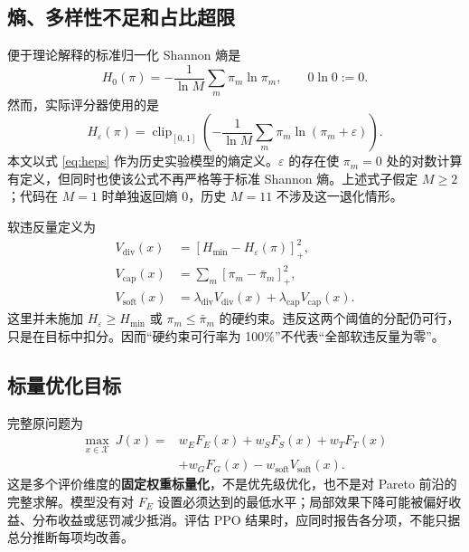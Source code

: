 \documentclass[UTF8,11pt,a4paper,fontset=fandol]{ctexart}
\newcommand{\clip}{\operatorname{clip}_{[0,1]}}
\newcommand{\X}{\mathcal X}
\begin{document}
\subsection{熵、多样性不足和占比超限}
便于理论解释的标准归一化 Shannon 熵是
\begin{equation}
 H_0(\pi)=-\frac{1}{\ln M}\sum_m\pi_m\ln\pi_m,\qquad 0\ln0:=0.\label{eq:h0}
\end{equation}
然而，实际评分器使用的是
\begin{equation}
 H_\varepsilon(\pi)=\clip\left(-\frac{1}{\ln M}
           \sum_m\pi_m\ln(\pi_m+\varepsilon)\right).\label{eq:heps}
\end{equation}
本文以式 \eqref{eq:heps} 作为历史实验模型的熵定义。$\varepsilon$ 的存在使 $\pi_m=0$ 处的对数计算有定义，但同时也使该公式不再严格等于标准 Shannon 熵。上述式子假定 $M\ge2$；代码在 $M=1$ 时单独返回熵 0，历史 $M=11$ 不涉及这一退化情形。

软违反量定义为
\begin{align}
 V_{\mathrm{div}}(x)&=[H_{\min}-H_\varepsilon(\pi)]_+^2,\label{eq:vdiv}\\
 V_{\mathrm{cap}}(x)&=\sum_m[\pi_m-\bar\pi_m]_+^2,\label{eq:vcap}\\
 V_{\mathrm{soft}}(x)&=\lambda_{\mathrm{div}}V_{\mathrm{div}}(x)
                  +\lambda_{\mathrm{cap}}V_{\mathrm{cap}}(x).\label{eq:vsoft}
\end{align}
这里并未施加 $H_\varepsilon\ge H_{\min}$ 或 $\pi_m\le\bar\pi_m$ 的硬约束。违反这两个阈值的分配仍可行，只是在目标中扣分。因而“硬约束可行率为 100\%”不代表“全部软违反量为零”。

\subsection{标量优化目标}
完整原问题为
\begin{equation}
 \boxed{\begin{aligned}
 \max_{x\in\X}\ J(x)={}&w_EF_E(x)+w_SF_S(x)+w_TF_T(x)\\
 &+w_GF_G(x)-w_{\mathrm{soft}}V_{\mathrm{soft}}(x).
 \end{aligned}}\label{eq:original}
\end{equation}
这是多个评价维度的\textbf{固定权重标量化}，不是优先级优化，也不是对 Pareto 前沿的完整求解。模型没有对 $F_E$ 设置必须达到的最低水平；局部效果下降可能被偏好收益、分布收益或惩罚减少抵消。评估 PPO 结果时，应同时报告各分项，不能只据总分推断每项均改善。
\end{document}
